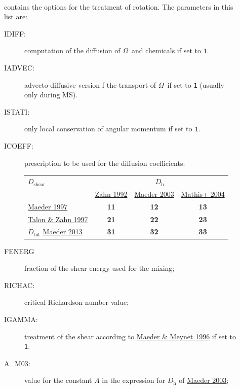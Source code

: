 \documentclass[11pt]{article}
\def\om{\ensuremath{\Omega}}
\def\ddh{\ensuremath{D_\text{h}}}
\def\dshear{\ensuremath{D_\text{shear}}}
\begin{document}
\begin{description}
  \item[] ~\\ contains the options for the treatment of rotation. The parameters in this list are:
    \begin{description}
      \item[IDIFF:] computation of the diffusion of \om\ and chemicals if set to \texttt{1}.
      \item[IADVEC:] advecto-diffusive version f the transport of \om\ if set to \texttt{1} (usually only during MS).
      \item[ISTATI:] only local conservation of angular momentum if set to \texttt{1}.
      \item[ICOEFF:] prescription to be used for the diffusion coefficients:\\[.3cm]
        \begin{tabular}{l|ccc}
    \dshear  & \multicolumn{3}{c}{\ddh} \\
    & \href{https://ui.adsabs.harvard.edu/abs/1992A&A...265..115Z}{Zahn 1992} & \href{https://ui.adsabs.harvard.edu/abs/2003A&A...399..263M}{Maeder 2003} & \href{http://dx.doi.org/10.1051/0004-6361:20040279
https://ui.adsabs.harvard.edu/abs/2004A&A...425..243M}{Mathis+ 2004} \\
  \hline
 \href{https://ui.adsabs.harvard.edu/abs/1997A&A...321..134M}{Maeder 1997} & {\ttfamily\textbf{11}} & {\ttfamily\textbf{12}} & {\ttfamily\textbf{13}} \\
 \href{https://ui.adsabs.harvard.edu/abs/1997A&A...317..749T}{Talon \& Zahn 1997} & {\ttfamily\textbf{21}} & {\ttfamily\textbf{22}} & {\ttfamily\textbf{23}} \\
 $D_\text{tot}$ \href{https://ui.adsabs.harvard.edu/abs/2013A&A...553A...1M}{Maeder 2013} & {\ttfamily\textbf{31}} & {\ttfamily\textbf{32}} & {\ttfamily\textbf{33}} \\
        \end{tabular} \vspace{.3cm}
      \item[FENERG] fraction of the shear energy used for the mixing;
      \item[RICHAC:] critical Richardson number value;
      \item[IGAMMA:] treatment of the shear according to \href{https://ui.adsabs.harvard.edu/abs/1996A&A...313..140M}{Maeder \& Meynet 1996} if set to \texttt{1}.
      \item[A\_M03:] value for the constant $A$ in the expression for {\ddh} of \href{https://ui.adsabs.harvard.edu/abs/2003A&A...399..263M}{Maeder 2003};

\end{description}
\end{description}
\end{document}
